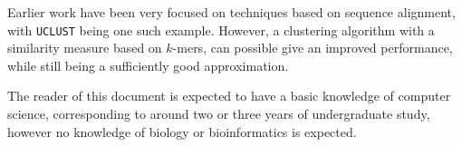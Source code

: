 Earlier work have been very focused on techniques based on sequence alignment,
with \texttt{UCLUST} being one such example. However, a clustering algorithm
with a similarity measure based on $k$-mers, can possible give an improved
performance, while still being a sufficiently good approximation.

The reader of this document is expected to have a basic knowledge of computer
science, corresponding to around two or three years of undergraduate study,
however no knowledge of biology or bioinformatics is expected.
